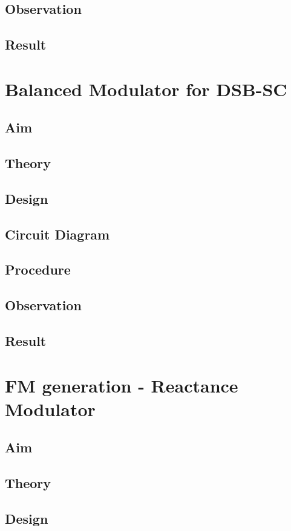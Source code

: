 \documentclass{book}
\begin{document}
\section*{Observation}
\section*{Result}

\chapter[Balanced Modulator for DSB-SC]{Balanced Modulator for DSB-SC}
\section*{Aim}
\section*{Theory}
\section*{Design}
\section*{Circuit Diagram}
\section*{Procedure}
\section*{Observation}
\section*{Result}


\chapter[FM generation - Reactance Modulator]{FM generation - Reactance Modulator}
\section*{Aim}
\section*{Theory}
\section*{Design}
\end{document}
